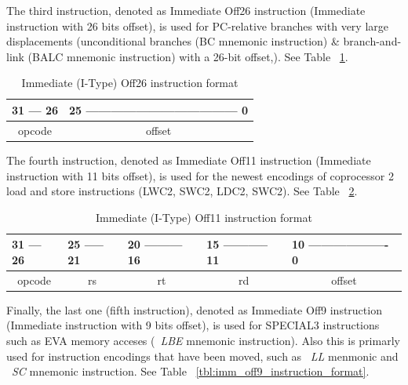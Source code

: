 \documentclass[
  oneside,
  11pt, a4paper,
  footinclude=true,
  headinclude=true,
  cleardoublepage=empty
]{scrbook}
\begin{document}

The third instruction, denoted as Immediate Off26 instruction (Immediate instruction with 26 bits offset), is used for PC-relative branches with very large displacements (unconditional branches (BC mnemonic instruction) \& branch-and-link (BALC mnemonic instruction) with a 26-bit offset,).
See Table ~\ref{tbl:imm_off26_instruction}.

\begin{table}[h!]
\centering
\begin{tabular}{l|lll}
31 --- 26                    & \multicolumn{3}{l}{25 ------------------------------------ 0} \\ \hline
\multicolumn{1}{|c|}{opcode} & \multicolumn{3}{c|}{offset}                                   \\ \hline
\end{tabular}
\caption{Immediate (I-Type) Off26 instruction format}
\label{tbl:imm_off26_instruction}
\end{table}

The fourth instruction, denoted as Immediate Off11 instruction (Immediate instruction with 11 bits offset), is used for the newest encodings of coprocessor 2 load and store instructions (LWC2, SWC2, LDC2, SWC2).
See Table ~\ref{tbl:imm_off11_instruction_format}.

\begin{table}[h!]
\centering
\begin{tabular}{l|l|l|l|l}
31 --- 26                    & 25 ----- 21             & 20 --------- 16         & 15 ----------- 11       & 10 ------------------- 0    \\ \hline
\multicolumn{1}{|c|}{opcode} & \multicolumn{1}{c|}{rs} & \multicolumn{1}{c|}{rt} & \multicolumn{1}{c|}{rd} & \multicolumn{1}{c|}{offset} \\ \hline
\end{tabular}
\caption{Immediate (I-Type) Off11 instruction format}
\label{tbl:imm_off11_instruction_format}
\end{table}

Finally, the last one (fifth instruction), denoted as Immediate Off9 instruction (Immediate instruction with 9 bits offset), is used for SPECIAL3 instructions such as EVA memory acceses (~\textit{LBE} mnemonic instruction). Also this is primarly used for instruction encodings that have been moved, such as ~\textit{LL} menmonic and ~\textit{SC} mnemonic instruction.
See Table ~\ref{tbl:imm_off9_instruction_format}.
\end{document}
